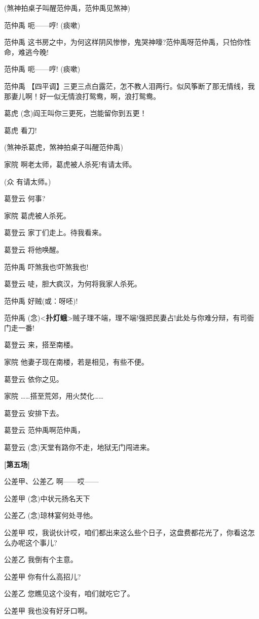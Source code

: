 (煞神拍桌子叫醒范仲禹，范仲禹见煞神)

范仲禹 呃------哼! (痰嗽)

范仲禹
这书房之中，为何这样阴风惨惨，鬼哭神嚎?范仲禹呀范仲禹，只怕你性命，难逃今晚!

范仲禹 呃------哼! (痰嗽)

范仲禹
【四平调】三更三点白露茫，怎不教人泪两行。似风筝断了那无情线，我那妻儿啊！好一似无情浪打鸳鸯，啊，浪打鸳鸯。

葛虎 (念)阎王叫你三更死，岂能留你到五更！

葛虎 看刀!

(煞神杀葛虎，煞神拍桌子叫醒范仲禹)

家院 啊老太师，葛虎被人杀死!有请太师。

(众 有请太师。)

葛登云 何事?

家院 葛虎被人杀死。

葛登云 家丁们走上。待我看来。

葛登云 将他唤醒。

范仲禹 吓煞我也!吓煞我也!

葛登云 唗，胆大疯汉，为何将我家人杀死。

范仲禹 好贼(或：呀呸)!

范仲禹
(念)\textless{}\textbf{扑灯蛾}\textgreater{}贼子理不端，理不端!强把民妻占!此处与你难分辩，有司衙门走一番!

葛登云 来，搭至南楼。

家院 他妻子现在南楼，若是相见，有些不便。

葛登云 依你之见。

家院 \ldots{}\ldots{}搭至荒郊，用火焚化\ldots{}\ldots{}

葛登云 安排下去。

葛登云 范仲禹啊范仲禹，

葛登云 (念)天堂有路你不走，地狱无门闯进来。

\textbf{{[}第五场{]}}

公差甲、公差乙 啊------哎------

公差甲 (念)中状元扬名天下

公差乙 (念)琼林宴何处寻他。

公差甲
哎，我说伙计哎，咱们都出来这么些个日子，这盘费都花光了，你看这怎么办呢这个事儿?

公差乙 我倒有个主意。

公差甲 你有什么高招儿?

公差乙 您瞧见这个没有，咱们就吃它了。

公差甲 我也没有好牙口啊。

